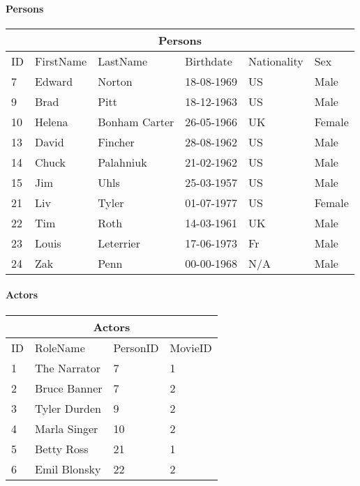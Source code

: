 \paragraph{Persons}
\begin{center}
\begin{tabular}{|l|l|l|l|l|l|}
\hline
\multicolumn{6}{|c|}{Persons} \\ \hline
ID & FirstName & LastName & Birthdate & Nationality & Sex \\ \hline
7 & Edward & Norton & 18-08-1969 & US & Male \\ \hline
9 & Brad & Pitt & 18-12-1963 & US & Male \\ \hline
10 & Helena & Bonham Carter & 26-05-1966 & UK & Female \\ \hline
13 & David & Fincher & 28-08-1962 & US & Male \\ \hline
14 & Chuck & Palahniuk & 21-02-1962 & US & Male \\ \hline
15 & Jim & Uhls & 25-03-1957 & US & Male \\ \hline
21 & Liv & Tyler & 01-07-1977 & US & Female \\ \hline
22 & Tim & Roth & 14-03-1961 & UK & Male \\ \hline
23 & Louis & Leterrier & 17-06-1973 & Fr & Male \\ \hline
24 & Zak & Penn & 00-00-1968 & N/A & Male \\ \hline
\end{tabular}
\end{center}

\paragraph{Actors}
\begin{center}
\begin{tabular}{|l|l|l|l|}
\hline
\multicolumn{4}{|c|}{Actors} \\ \hline
ID & RoleName & PersonID & MovieID \\ \hline
1 & The Narrator & 7 & 1 \\ \hline
2 & Bruce Banner & 7 & 2 \\ \hline
3 & Tyler Durden & 9 & 2 \\ \hline
4 & Marla Singer & 10 & 2 \\ \hline
5 & Betty Ross & 21 & 1 \\ \hline
6 & Emil Blonsky & 22 & 2 \\\hline 
\end{tabular}
\end{center}

